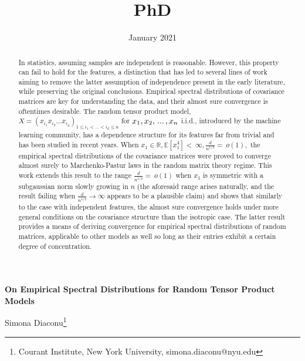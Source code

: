 \documentclass{article}
\title{PhD}
\author{}
\date{January 2021}
\numberwithin{equation}{section}
\begin{document}
\begin{center}
    \textbf{On Empirical Spectral Distributions for Random Tensor Product Models}%
\end{center}

\begin{center}
     Simona Diaconu\footnote{Courant Institute, New York University, simona.diaconu@nyu.edu}
\end{center}

\begin{abstract}
    In statistics, assuming samples are independent is reasonable. However, this property can fail to hold for the features, %
    a distinction that has led to several lines of work aiming to remove the latter assumption of independence %
    present in the early literature, while preserving the original conclusions. %
    Empirical spectral distributions of %
    covariance matrices are key for understanding the data, and their almost sure convergence is oftentimes
    desirable. The random tensor product model, \(X=(x_{i_1}x_{i_2}...x_{i_d})_{1 \leq i_1<...<i_d \leq n}\) %
    for \(x_1,x_2,\hspace{0.05cm}...\hspace{0.05cm},x_n\) i.i.d., introduced by the machine learning community, has a dependence structure for its features far from trivial and has been studied %
    in recent years. When \(x_1 \in \mathbb{R}, \mathbb{E}[x_1^4]<~\infty, \frac{d}{n^{1/3}}=~o(1),\) the empirical spectral distributions of the covariance matrices were proved to converge almost surely to Marchenko-Pastur laws in the random matrix theory regime. This work extends this result to the range \(\frac{d}{n^{1/2}}=~o(1)\) when \(x_1\) is symmetric with a subgaussian norm slowly growing in \(n\) %
    (the aforesaid range arises naturally, and the result failing when \(\frac{d}{n^{1/2}} \to \infty\) appears to be a plausible claim) and shows that similarly to the case with independent features, %
    the almost sure convergence holds under more general conditions on the covariance structure than the isotropic case. The latter result %
    provides a means of deriving convergence for empirical spectral distributions of random matrices, applicable %
    to other models as well so long as their entries exhibit a certain degree of concentration. %
\end{abstract}
\end{document}
